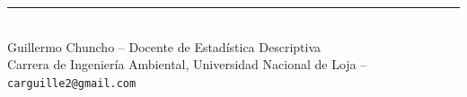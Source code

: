 \documentclass[11pt,a4paper]{article}
\begin{document}
\vspace{0.6em}
\begin{center}
\rule{0.5\textwidth}{0.5pt}\\[2pt]
{\footnotesize Guillermo Chuncho -- Docente de Estadística Descriptiva\\
Carrera de Ingeniería Ambiental, Universidad Nacional de Loja -- \texttt{carguille2@gmail.com}}
\end{center}
\end{document}
